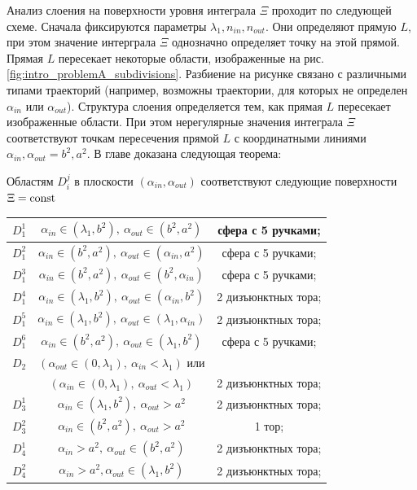 Анализ слоения на поверхности уровня интеграла $\Xi$ проходит по следующей схеме. Сначала фиксируются параметры $\lambda_1, n_{in}, n_{out}$. Они определяют прямую $L$, при этом значение интерграла $\Xi$ однозначно определяет точку на этой прямой. Прямая $L$ пересекает некоторые области, изображенные на рис. \ref{fig:intro_problemA_subdivisions}. Разбиение на рисунке связано с различными типами траекторий (например, возможны траектории, для которых не определен $\alpha_{in}$ или $\alpha_{out}$).
Структура слоения определяется тем, как прямая $L$ пересекает изображенные области.
При этом нерегулярные значения интеграла $\Xi$ соответствуют точкам пересечения прямой $L$ с координатными линиями $\alpha_{in}, \alpha_{out} = b^2, a^2$. 
В главе доказана следующая теорема:
\newpage
\renewcommand{\thetheorem}{10}
\begin{theorem}
Областям $D_i^j$ в плоскости $(\alpha_{in}, \alpha_{out})$ соответствуют следующие поверхности $\Xi = \mathrm{const}$
\begin{center}
\begin{tabular}{|c|c|c|}
\hline
$D_1^1$  	& 	$\alpha_{in} \in (\lambda_1, b^2), \ \alpha_{out} \in (b^2, a^2)$			& сфера с 5 ручками; \\ \hline 
$D_1^2$  	& 	$\alpha_{in} \in (b^2, a^2), \ \alpha_{out} \in (\alpha_{in}, a^2)$				& сфера с 5 ручками; \\ \hline 
$D_1^3$  	& 	$\alpha_{in} \in (b^2, a^2), \ \alpha_{out} \in (b^2, \alpha_{in})$				& сфера с 5 ручками; \\ \hline 
$D_1^4$ 	& 	$\alpha_{in} \in (\lambda_1, b^2), \ \alpha_{out} \in (\alpha_{in}, b^2)$	& 2 дизъюнктных тора; \\ \hline 
$D_1^5$  	& 	$\alpha_{in} \in (\lambda_1, b^2), \ \alpha_{out} \in (\lambda_1, \alpha_{in})$	& 2 дизъюнктных тора; \\ \hline 
$D_1^6$  	& 	$\alpha_{in} \in (b^2, a^2), \ \alpha_{out} \in (\lambda_1, b^2)$			& сфера с 5 ручками; \\             
\midrule  
$D_2$  	& 	$(\alpha_{out} \in (0, \lambda_1), \ \alpha_{in} < \lambda_1)$ или & \\
		&  $(\alpha_{in} \in (0, \lambda_1), \ \alpha_{out} < \lambda_1)$				& 2 дизъюнктных тора; \\ 
\midrule 
$D_3^1$  	& 	$\alpha_{in} \in (\lambda_1, b^2), \ \alpha_{out} > a^2$				& 2 дизъюнктных тора; \\ \hline 
$D_3^2$  	& 	$\alpha_{in} \in (b^2, a^2), \ \alpha_{out} > a^2 $					& 1 тор; \\             
\midrule 
$D_4^1$  	& 	$\alpha_{in} > a^2, \ \alpha_{out} \in (b^2, a^2)$						& 2 дизъюнктных тора; \\ \hline 
$D_4^2$  	& 	$\alpha_{in} > a^2, \alpha_{out} \in (\lambda_1, b^2)$				& 2 дизъюнктных тора; \\ \hline 
\end{tabular}
\end{center}
\label{st:intron1_n2_surfaces}
\end{theorem} 

